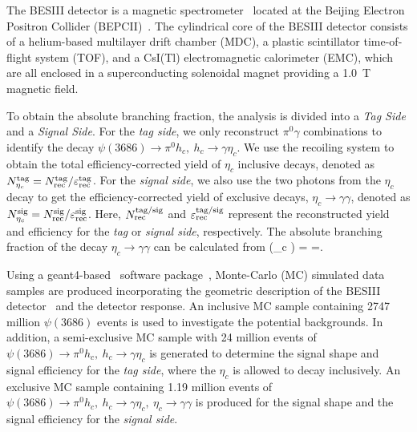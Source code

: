\documentclass[twocolumn,showpacs,aps,prl]{revtex4-2}
\let\oldequation\equation
\let\oldendequation\endequation
\renewenvironment{equation}
{\linenomathNonumbers\oldequation}
{\oldendequation\endlinenomath}
\begin{document}
The BESIII detector is a magnetic spectrometer~\cite{BESIII:2009fln} located at the Beijing Electron Positron Collider (BEPCII)~\cite{Yu:2016cof}. The cylindrical core of the BESIII detector consists of a helium-based multilayer drift chamber (MDC), a plastic scintillator time-of-flight system (TOF), and a CsI(Tl) electromagnetic calorimeter (EMC), which are all enclosed in a superconducting solenoidal magnet providing a 1.0~T magnetic field.

To obtain the absolute branching fraction, the analysis is divided into a \textit{Tag Side} and a \textit{Signal Side}. For the \textit{tag side}, we only reconstruct $\pi^0 \gamma$ combinations to identify the decay $\psi(3686) \to \pi^0 h_c,~h_c \to \gamma \eta_c$. We use the recoiling system to obtain the total efficiency-corrected yield of $\eta_c$ inclusive decays, denoted as $N_{\eta_c}^{\rm tag}= N^{\rm tag}_{\rm rec} / \varepsilon^{\rm tag}_{\rm rec}$. For the \textit{signal side}, we also use the two photons from the $\eta_c$ decay to get the efficiency-corrected yield of exclusive decays, $\eta_c \to \gamma \gamma$, denoted as $N_{\eta_c}^{\rm sig} = N^{\rm sig}_{\rm rec} / \varepsilon^{\rm sig}_{\rm rec}$. Here, $N^{\rm tag/sig}_{\rm rec}$ and $\varepsilon^{\rm tag/sig}_{\rm rec}$ represent the reconstructed yield and efficiency for the \textit{tag} or \textit{signal side}, respectively. The absolute branching fraction of the decay $\eta_c \to \gamma\gamma $ can be calculated from
\begin{equation}
\label{equ:branching_fraction}
(\eta_c \to \gamma \gamma) =  =.
\end{equation}

Using a {\sc geant4}-based~\cite{GEANT4:2002zbu, Allison:2006ve, Allison:2016lfl} software package~\cite{2006ObjectorientedBD}, Monte-Carlo (MC) simulated data samples are produced incorporating the geometric description of the BESIII detector~\cite{Ya-Jun:2008mrr, Liang:2009zzb, Huang:2022wuo} and the detector response. An inclusive MC sample containing 2747 million $\psi(3686)$ events is used to investigate the potential backgrounds. In addition, a semi-exclusive MC sample with 24 million events of $\psi(3686) \to \pi^0 h_c,~h_c \to \gamma \eta_c$ is generated to determine the signal shape and signal efficiency for the \textit{tag side}, where the $\eta_c$ is allowed to decay inclusively. An exclusive MC sample containing 1.19 million events of $\psi(3686) \to \pi^0 h_c,~h_c \to \gamma \eta_c,~\eta_c \to \gamma \gamma$ is produced for the signal shape and the signal efficiency for the \textit{signal side}.
\end{document}

